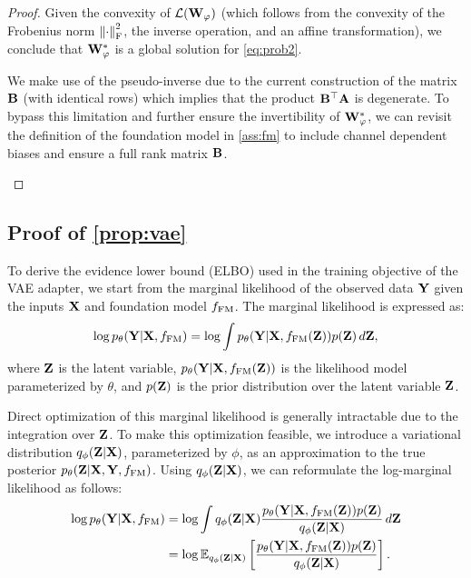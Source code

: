 \begin{proof}
Given the convexity of $\mathcal{L} (\mathbf{W}_{\varphi})$ (which follows from the convexity of the Frobenius norm $\left\lVert\cdot\right\rVert_{\mathrm{F}}^2$, the inverse operation, and an affine transformation), we conclude that $\mathbf{W}_{\varphi}^*$ is a global solution for \cref{eq:prob2}.

\begin{remark}
    We make use of the pseudo-inverse due to the current construction of the matrix ${\bf B}$ (with identical rows) which implies that the product ${\bf B}^\top \mathbf{A}$ is degenerate. To bypass this limitation and further ensure the invertibility of $\mathbf{W}_{\varphi}^*$, we can revisit the definition of the foundation model in \cref{ass:fm} to include channel dependent biases and ensure a full rank matrix ${\bf B}$.
\end{remark}

\end{proof}
    
\subsection{Proof of \cref{prop:vae}}
\label{appendix:vae_proof}

To derive the evidence lower bound (ELBO) used in the training objective of the VAE adapter, we start from the marginal likelihood of the observed data $\mathbf{Y}$ given the inputs $\mathbf{X}$ and foundation model $f_{\mathrm{FM}}$. The marginal likelihood is expressed as:
\begin{equation}
\log p_\theta(\mathbf{Y}|\mathbf{X}, f_{\mathrm{FM}}) = \log \int p_\theta(\mathbf{Y}|\mathbf{X}, f_{\mathrm{FM}}(\mathbf{Z})) p(\mathbf{Z}) \, d\mathbf{Z},
\end{equation}
where $\mathbf{Z}$ is the latent variable, $p_\theta(\mathbf{Y}|\mathbf{X}, f_{\mathrm{FM}}(\mathbf{Z}))$ is the likelihood model parameterized by $\theta$, and $p(\mathbf{Z})$ is the prior distribution over the latent variable $\mathbf{Z}$.

Direct optimization of this marginal likelihood is generally intractable due to the integration over $\mathbf{Z}$. To make this optimization feasible, we introduce a variational distribution $q_\phi(\mathbf{Z}|\mathbf{X})$, parameterized by $\phi$, as an approximation to the true posterior $p_\theta(\mathbf{Z}|\mathbf{X}, \mathbf{Y}, f_{\mathrm{FM}})$. Using $q_\phi(\mathbf{Z}|\mathbf{X})$, we can reformulate the log-marginal likelihood as follows:
\begin{align}
\log p_\theta(\mathbf{Y}|\mathbf{X}, f_{\mathrm{FM}}) 
&= \log \int q_\phi(\mathbf{Z}|\mathbf{X}) \frac{p_\theta(\mathbf{Y}|\mathbf{X}, f_{\mathrm{FM}}(\mathbf{Z})) p(\mathbf{Z})}{q_\phi(\mathbf{Z}|\mathbf{X})} \, d\mathbf{Z} \\
&= \log \mathbb{E}_{q_\phi(\mathbf{Z}|\mathbf{X})} \left[ \frac{p_\theta(\mathbf{Y}|\mathbf{X}, f_{\mathrm{FM}}(\mathbf{Z})) p(\mathbf{Z})}{q_\phi(\mathbf{Z}|\mathbf{X})} \right].
\end{align}

